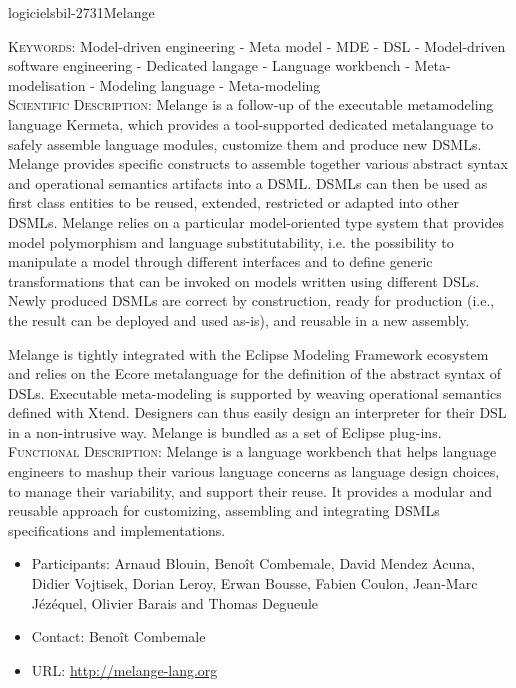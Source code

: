 \documentclass{ra2018}
\begin{document}
 \begin{module}{logiciels}{bil-2731}{Melange}

   \textsc{Keywords:} Model-driven engineering - Meta model - MDE - DSL - Model-driven software engineering - Dedicated langage - Language workbench - Meta-modelisation - Modeling language - Meta-modeling \\ 


    \textsc{Scientific Description:} Melange is a follow-up of the executable metamodeling language Kermeta, which provides a tool-supported dedicated metalanguage to safely assemble language modules, customize them and produce new DSMLs. Melange provides specific constructs to assemble together various abstract syntax and operational semantics artifacts into a DSML. DSMLs can then be used as first class entities to be reused, extended, restricted or adapted into other DSMLs. Melange relies on a particular model-oriented type system that provides model polymorphism and language substitutability, i.e. the possibility to manipulate a model through different interfaces and to define generic transformations that can be invoked on models written using different DSLs. Newly produced DSMLs are correct by construction, ready for production (i.e., the result can be deployed and used as-is), and reusable in a new assembly.

Melange is tightly integrated with the Eclipse Modeling Framework ecosystem and relies on the Ecore metalanguage for the definition of the abstract syntax of DSLs. Executable meta-modeling is supported by weaving operational semantics defined with Xtend. Designers can thus easily design an interpreter for their DSL in a non-intrusive way. Melange is bundled as a set of Eclipse plug-ins.\\

 \textsc{Functional Description:}  Melange is a language workbench that helps language engineers to mashup their various language concerns as language design choices, to manage their variability, and support their reuse. It provides a modular and reusable approach for customizing, assembling and integrating DSMLs specifications and implementations.\\

   \begin{itemize}
      \item Participants: Arnaud Blouin, Benoît Combemale, David Mendez Acuna, Didier Vojtisek, Dorian Leroy, Erwan Bousse, Fabien Coulon, Jean-Marc Jézéquel, Olivier Barais and Thomas Degueule
      \item Contact: Benoît Combemale
      \item URL: \url{http://melange-lang.org}
   \end{itemize}

 \end{module}
\end{document}
